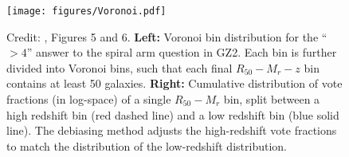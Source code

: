 \begin{figure}
\centering
\texttt{[image: figures/Voronoi.pdf]}
\caption{Credit: \citet{Hart2016}, Figures 5 and 6. \textbf{Left:} Voronoi bin distribution for the ``$>4$'' answer to the spiral arm question in GZ2. Each bin is further divided into Voronoi bins, such that each final $R_{50}-M_{r}-z$ bin contains at least 50 galaxies. \textbf{Right:} Cumulative distribution of vote fractions (in log-space) of a single $R_{50}-M_{r}$ bin, split between a high redshift bin (red dashed line) and a low redshift bin (blue solid line). The debiasing method adjusts the high-redshift vote fractions to match the distribution of the low-redshift distribution. }
\label{fig:voronoi}
\end{figure}








